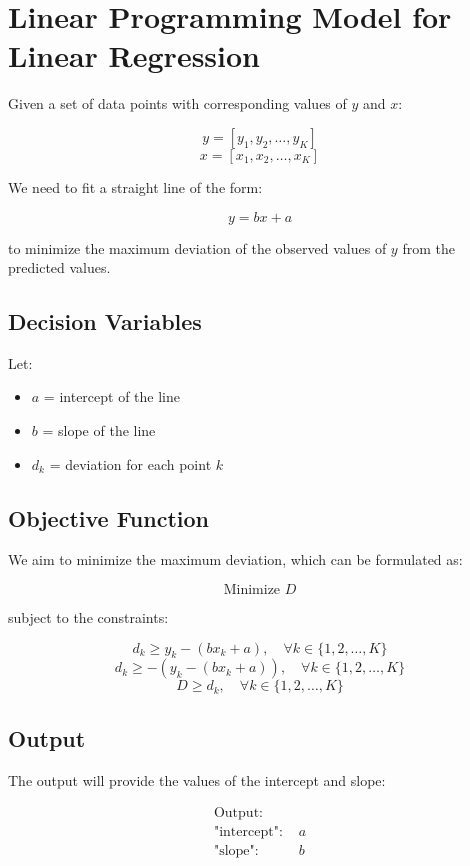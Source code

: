 \documentclass{article}
\begin{document}
\section*{Linear Programming Model for Linear Regression}

Given a set of data points with corresponding values of \( y \) and \( x \):

\[
y = [y_{1}, y_{2}, \ldots, y_{K}]
\]
\[
x = [x_{1}, x_{2}, \ldots, x_{K}]
\]

We need to fit a straight line of the form:

\[
y = bx + a
\]

to minimize the maximum deviation of the observed values of \( y \) from the predicted values.

\subsection*{Decision Variables}
Let:
\begin{itemize}
    \item \( a \) = intercept of the line
    \item \( b \) = slope of the line
    \item \( d_{k} \) = deviation for each point \( k \)
\end{itemize}

\subsection*{Objective Function}
We aim to minimize the maximum deviation, which can be formulated as:

\[
\text{Minimize } D
\]

subject to the constraints:

\[
d_{k} \geq y_{k} - (bx_{k} + a), \quad \forall k \in \{1, 2, \ldots, K\}
\]
\[
d_{k} \geq -(y_{k} - (bx_{k} + a)), \quad \forall k \in \{1, 2, \ldots, K\}
\]
\[
D \geq d_{k}, \quad \forall k \in \{1, 2, \ldots, K\}
\]

\subsection*{Output}
The output will provide the values of the intercept and slope:

\[
\begin{align*}
\text{Output:} \\
\text{"intercept": } & a \\
\text{"slope": } & b 
\end{align*}
\]
\end{document}
